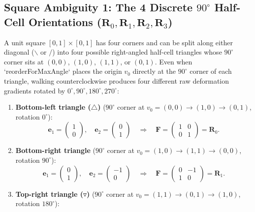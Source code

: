\documentclass[11pt,a4paper]{article}
\begin{document}
\subsection{Square Ambiguity 1: The 4 Discrete $90^\circ$ Half-Cell Orientations ($\mathbf{R}_0, \mathbf{R}_1, \mathbf{R}_2, \mathbf{R}_3$)}
A unit square $[0,1]\times[0,1]$ has four corners and can be split along either diagonal ($\backslash$ or $/$) into four possible right-angled half-cell triangles whose $90^\circ$ corner sits at $(0,0)$, $(1,0)$, $(1,1)$, or $(0,1)$. Even when `reorderForMaxAngle` places the origin $v_0$ directly at the $90^\circ$ corner of each triangle, walking counterclockwise produces four different raw deformation gradients rotated by $0^\circ, 90^\circ, 180^\circ, 270^\circ$:
\begin{enumerate}[noitemsep]
  \item \textbf{Bottom-left triangle ($\triangle$)} ($90^\circ$ corner at $v_0=(0,0) \to (1,0) \to (0,1)$, rotation $0^\circ$):
  \begin{equation}
    \mathbf{e}_1 = \begin{pmatrix} 1 \\ 0 \end{pmatrix}, \quad
    \mathbf{e}_2 = \begin{pmatrix} 0 \\ 1 \end{pmatrix}
    \quad\Longrightarrow\quad
    \mathbf{F} = \begin{pmatrix} 1 & 0 \\ 0 & 1 \end{pmatrix} = \mathbf{R}_0.
  \end{equation}
  \item \textbf{Bottom-right triangle} ($90^\circ$ corner at $v_0=(1,0) \to (1,1) \to (0,0)$, rotation $90^\circ$):
  \begin{equation}
    \mathbf{e}_1 = \begin{pmatrix} 0 \\ 1 \end{pmatrix}, \quad
    \mathbf{e}_2 = \begin{pmatrix} -1 \\ 0 \end{pmatrix}
    \quad\Longrightarrow\quad
    \mathbf{F} = \begin{pmatrix} 0 & -1 \\ 1 & 0 \end{pmatrix} = \mathbf{R}_1.
  \end{equation}
  \item \textbf{Top-right triangle ($\triangledown$)} ($90^\circ$ corner at $v_0=(1,1) \to (0,1) \to (1,0)$, rotation $180^\circ$):

\end{enumerate}
\end{document}
